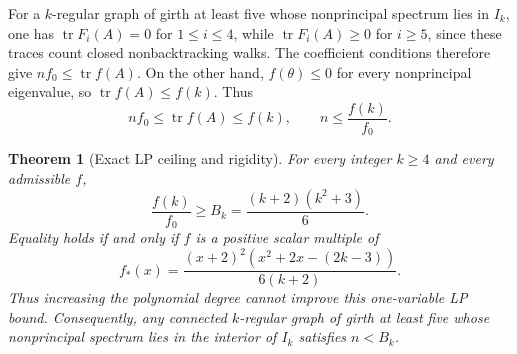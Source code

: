 \documentclass[a4paper,10pt,reqno]{amsart}
\theoremstyle{plain}
\newtheorem{theorem}{Theorem}[section]
\theoremstyle{definition}
\theoremstyle{remark}
\newcommand{\tr}{\operatorname{tr}}
\newcommand{\resultbox}[1]{\boxed{#1}}
\begin{document}
For a \(k\)-regular graph of girth at least five whose nonprincipal spectrum
lies in \(I_k\), one has \(\tr F_i(A)=0\) for \(1\le i\le4\), while
\(\tr F_i(A)\ge0\) for \(i\ge5\), since these traces count closed
nonbacktracking walks.  The coefficient conditions therefore give
\(nf_0\le\tr f(A)\).  On the other hand, \(f(\theta)\le0\) for every
nonprincipal eigenvalue, so \(\tr f(A)\le f(k)\).  Thus
\[
 nf_0\le\tr f(A)\le f(k),
 \qquad n\le\frac{f(k)}{f_0}.
\]

\begin{theorem}[Exact LP ceiling and rigidity]\label{thm:lp-ceiling}
For every integer \(k\ge4\) and every admissible \(f\),
\[
 \resultbox{
 \frac{f(k)}{f_0}\ge B_k=\frac{(k+2)(k^2+3)}6.
 }
\]
Equality holds if and only if \(f\) is a positive scalar multiple of
\[
 \resultbox{
 f_*(x)=\frac{(x+2)^2(x^2+2x-(2k-3))}{6(k+2)}.
 }
\]
Thus increasing the polynomial degree cannot improve this one-variable LP
bound.  Consequently, any connected \(k\)-regular graph of girth at least
five whose nonprincipal spectrum lies in the interior of \(I_k\) satisfies
\(n<B_k\).
\end{theorem}
\end{document}
